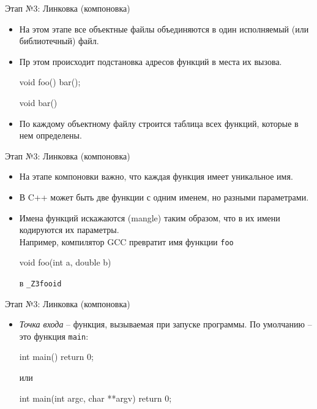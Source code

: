 \documentclass[
    9pt,
    hyperref={pdfencoding=unicode}
    ]{beamer}
\begin{document}
\begin{frame}[fragile]{Этап №3: Линковка (компоновка)}
    \begin{itemize}
        \item На этом этапе все объектные файлы объединяются в один исполняемый (или библиотечный) файл.
        \item Пр этом происходит подстановка адресов функций в места их вызова.
        \begin{cppcode}
            void foo()
            {
                bar();
            }
        \end{cppcode}
        
        \vspace{1em}
        \begin{cppcode}
            void bar() { }
        \end{cppcode}
        \item По каждому объектному файлу строится таблица всех функций, которые в нем определены.
    \end{itemize}
\end{frame}

\begin{frame}[fragile]{Этап №3: Линковка (компоновка)}
    \begin{itemize}
        \item На этапе компоновки важно, что каждая функция имеет уникальное имя.
        \item В C++ может быть две функции с одним именем, но разными параметрами. 
        \item Имена функций искажаются (mangle) таким образом, что в их имени кодируются их параметры.\\
        Например, компилятор GCC превратит имя функции \texttt{foo}
        
        \begin{cppcode}
            void foo(int a, double b) {}
        \end{cppcode}

    в \texttt{\_Z3fooid}
    \end{itemize}
\end{frame}


\begin{frame}[fragile]{Этап №3: Линковка (компоновка)}
    \begin{itemize}
        \item \emph{Точка входа} -- функция, вызываемая при запуске программы. По умолчанию -- это функция \texttt{main}:
        \begin{cppcode}
            int main()
            {
                return 0;
            }
        \end{cppcode}
        или
        \begin{cppcode}
            int main(int argc, char **argv)
            {
                return 0;
            }
        \end{cppcode}
    \end{itemize}
\end{frame}
\end{document}
